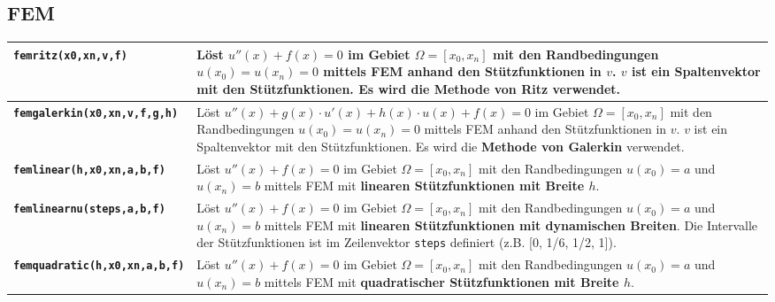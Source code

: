\subsection{FEM}
\begin{tabularx}{\textwidth}{l X}
    \hline
    \textbf{\texttt{femritz(x0,xn,v,f)}}          & Löst $u''(x)+f(x)=0$ im Gebiet $\Omega = [x_0, x_n]$ mit den Randbedingungen $u(x_0)=u(x_n)=0$ mittels FEM anhand den Stützfunktionen in $v$. $v$ ist ein Spaltenvektor mit den Stützfunktionen. Es wird die \textbf{Methode von Ritz} verwendet.                                          \\\hline
    \textbf{\texttt{femgalerkin(x0,xn,v,f,g,h)}}  & Löst $u''(x)+g(x)\cdot u'(x)+h(x)\cdot u(x)+f(x)=0$ im Gebiet $\Omega = [x_0, x_n]$ mit den Randbedingungen $u(x_0)=u(x_n)=0$ mittels FEM anhand den Stützfunktionen in $v$. $v$ ist ein Spaltenvektor mit den Stützfunktionen. Es wird die \textbf{Methode von Galerkin} verwendet.       \\\hline
    \textbf{\texttt{femlinear(h,x0,xn,a,b,f)}}    & Löst $u''(x)+f(x)=0$ im Gebiet $\Omega = [x_0, x_n]$ mit den Randbedingungen $u(x_0)=a$ und $u(x_n)=b$ mittels FEM mit \textbf{linearen Stützfunktionen mit Breite $h$}.                                                                                                                   \\\hline
    \textbf{\texttt{femlinearnu(steps,a,b,f)}}    & Löst $u''(x)+f(x)=0$ im Gebiet $\Omega = [x_0, x_n]$ mit den Randbedingungen $u(x_0)=a$ und $u(x_n)=b$ mittels FEM mit \textbf{linearen Stützfunktionen mit dynamischen Breiten}. Die Intervalle der Stützfunktionen ist im Zeilenvektor \texttt{steps} definiert (z.B. [0, 1/6, 1/2, 1]). \\\hline
    \textbf{\texttt{femquadratic(h,x0,xn,a,b,f)}} & Löst $u''(x)+f(x)=0$ im Gebiet $\Omega = [x_0, x_n]$ mit den Randbedingungen $u(x_0)=a$ und $u(x_n)=b$ mittels FEM mit \textbf{quadratischer Stützfunktionen mit Breite $h$}.                                                                                                              \\\hline
\end{tabularx}
\renewcommand{\arraystretch}{1.0}